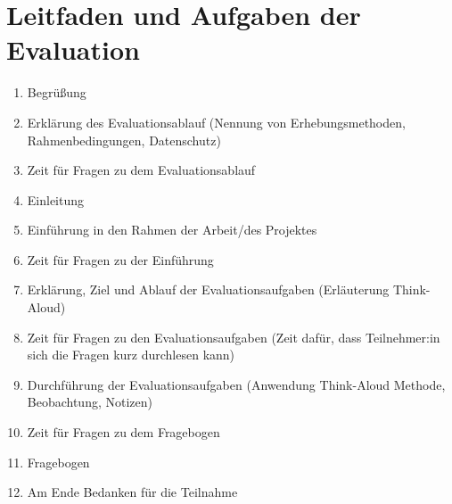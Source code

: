 \section{Leitfaden und Aufgaben der Evaluation}
\label{appendix:Evaluation}

\begin{enumerate}
    \item Begrüßung
    \item Erklärung des Evaluationsablauf (Nennung von Erhebungsmethoden, Rahmenbedingungen, Datenschutz)
    \item Zeit für Fragen zu dem Evaluationsablauf
    \item Einleitung
    \item Einführung in den Rahmen der Arbeit/des Projektes
    \item Zeit für Fragen zu der Einführung
    \item Erklärung, Ziel und Ablauf der Evaluationsaufgaben (Erläuterung Think-Aloud)
    \item Zeit für Fragen zu den Evaluationsaufgaben (Zeit dafür, dass Teilnehmer:in sich die Fragen kurz durchlesen kann)
    \item Durchführung der Evaluationsaufgaben (Anwendung Think-Aloud Methode, Beobachtung, Notizen)
    \item Zeit für Fragen zu dem Fragebogen
    \item Fragebogen
    \item Am Ende Bedanken für die Teilnahme
\end{enumerate}

